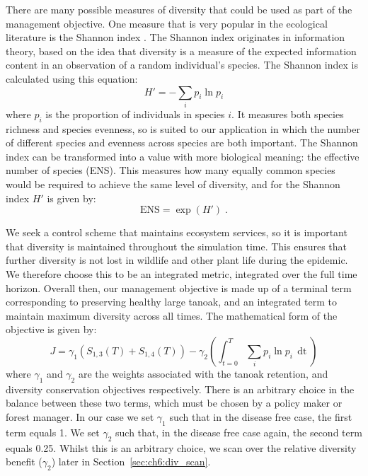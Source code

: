 There are many possible measures of diversity that could be used as part of the management objective. One measure that is very popular in the ecological literature is the Shannon index \citep[][pp.\ 106--108]{magurran_measuring_2013}. The Shannon index originates in information theory, based on the idea that diversity is a measure of the expected information content in an observation of a random individual's species. The Shannon index is calculated using this equation:
\begin{equation}\label{eqn:ch6:shannon_idx}
    H' = -\sum_ip_i\ln{p_i}
\end{equation}
where $p_i$ is the proportion of individuals in species $i$. It measures both species richness and species evenness, so is suited to our application in which the number of different species and evenness across species are both important. The Shannon index can be transformed into a value with more biological meaning: the effective number of species (ENS). This measures how many equally common species would be required to achieve the same level of diversity, and for the Shannon index $H'$ is given by:
\begin{equation}\label{eqn:ch6:shannon_ens}
    \textrm{ENS} = \exp(H')\;.
\end{equation}

We seek a control scheme that maintains ecosystem services, so it is important that diversity is maintained throughout the simulation time. This ensures that further diversity is not lost in wildlife and other plant life during the epidemic. We therefore choose this to be an integrated metric, integrated over the full time horizon. Overall then, our management objective is made up of a terminal term corresponding to preserving healthy large tanoak, and an integrated term to maintain maximum diversity across all times. The mathematical form of the objective is given by:
\begin{equation}\label{eqn:ch6:mgmt_obj}
    J = \gamma_1\left(S_{1,3}(T) + S_{1,4}(T)\right) - \gamma_2\left(\int_{t=0}^T \sum_ip_i\ln{p_i}\,\mathop{dt}\right)
\end{equation}
where $\gamma_1$ and $\gamma_2$ are the weights associated with the tanoak retention, and diversity conservation objectives respectively. There is an arbitrary choice in the balance between these two terms, which must be chosen by a policy maker or forest manager. In our case we set $\gamma_1$ such that in the disease free case, the first term equals 1. We set $\gamma_2$ such that, in the disease free case again, the second term equals 0.25. Whilst this is an arbitrary choice, we scan over the relative diversity benefit ($\gamma_2$) later in Section~\ref{sec:ch6:div_scan}.

